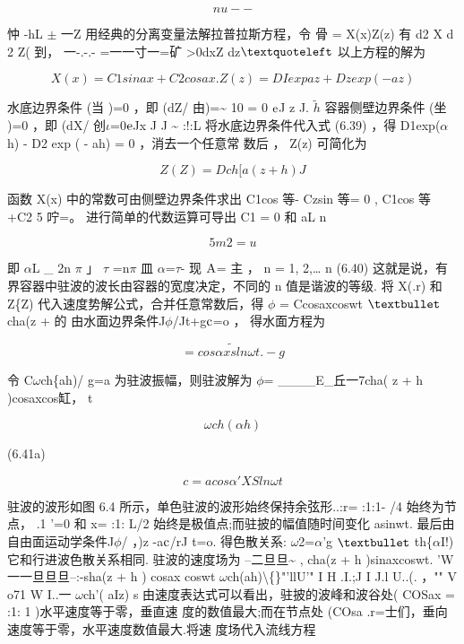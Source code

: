 \[nu --\]

忡 -hL $\pm $ 一Z 用经典的分离变量法解拉普拉斯方程，令 骨 = X(x)Z(z) 有 d2 X d 2 Z( 到， 一-.-.- =一一寸一=矿 >0dxZ dz${\rm ‘}$ 以上方程的解为

\begin{equation*}X(x) = C1 sinax + C 2 cosax. Z(z) = DI expaz + Dzexp(- az)\tag{6.39}\end{equation*}

水底边界条件 (当 )=0 ，即 (dZ/ 由)=\textasciitilde{} 10 = 0 ${\rm e}$J z J. $\tilde{h}$ 容器侧壁边界条件 (坐 )=0 ，即 (dX/ 创$\iota$=0${\rm e}$Jx J J \textasciitilde{} :!:L 将水底边界条件代入式 (6.39) ，得 D1exp($\alpha$ h) - D2 exp ( - ah) = 0 ，消去一个任意常 数后 ， Z(z) 可简化为

\[Z(Z) = Dch[a(z+h)J\]

函数 X(x) 中的常数可由侧壁边界条件求出 C1cos 等- Czsin 等= 0 , C1cos 等 +C2 5 咛=。 进行简单的代数运算可导出 C1 = 0 和 aL n

\[5m 2 = u\]

即 $\alpha$L \_ 2n $\pi$ 」 $\tau$ =n$\pi$ 皿 $\alpha$=$\tau$- 现 ${\rm A}$= 主 ， n = 1, 2,… n (6.40) 这就是说，有界容器中驻波的波长由容器的宽度决定，不同的 n 值是谐波的等级. 将 X(.r) 和 Z\{Z) 代入速度势解公式，合并任意常数后，得 $\phi$ = Ccosaxcoswt ${\rm •}$ cha(z + 的 由水面边界条件J$\phi$/Jt+g${\rm c}$=o ， 得水面方程为

\[= cos\alpha \tilde{xsl}n\omega t .-g\]

令 C$\omega$ch\{ah)/ g=a 为驻波振幅，则驻波解为 $\phi$= \_\_\_\_E\_丘一7cha( z + h )cosaxcos缸， t

\[\omega ch(\alpha h)\]

(6.41a)

\begin{equation*}c = acos\alpha 'XSln\omega  t\tag{6.41b}\end{equation*}

驻波的波形如图 6.4 所示，单色驻波的波形始终保持余弦形..:r= :1:1- /4 始终为节点， .1 '=0 和 x= :1: L/2 始终是极值点;而驻披的幅值随时间变化 asinwt. 最后由自由面运动学条件J$\phi$/ ，)z -a${\rm c}$/rJ t=o. 得色散关系: $\omega$2=$\alpha$'g ${\rm •}$ th\{$\alpha$I!) 它和行进波色散关系相同. 驻波的速度场为 --二旦旦\textasciitilde{} , cha(z + h )sinaxcoswt. 'W 一一旦旦旦--:-sha(z + h ) cosax coswt $\omega$ch(ah)\textbackslash\{\}"'llU'" I H .I.;J I J.l U..(. ，"" V o71 W I..一 $\omega$ch'( aIz) s 由速度表达式可以看出，驻披的波峰和波谷处( COSax = :1: 1 )水平速度等于零，垂直速 度的数值最大;而在节点处 (COsa .r=士们，垂向速度等于零，水平速度数值最大.将速 度场代入流线方程

